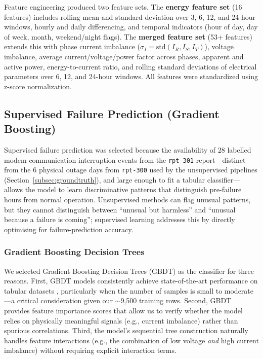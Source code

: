 \documentclass{article}
\begin{document}
Feature engineering produced two feature sets. The \textbf{energy feature set} (16 features) includes rolling mean and standard deviation over 3, 6, 12, and 24-hour windows, hourly and daily differencing, and temporal indicators (hour of day, day of week, month, weekend/night flags). The \textbf{merged feature set} (53+ features) extends this with phase current imbalance ($\sigma_I = \text{std}(I_R, I_S, I_T)$), voltage imbalance, average current/voltage/power factor across phases, apparent and active power, energy-to-current ratio, and rolling standard deviations of electrical parameters over 6, 12, and 24-hour windows. All features were standardized using z-score normalization.

\subsection{Supervised Failure Prediction (Gradient Boosting)}

Supervised failure prediction was selected because the availability of $28$ labelled modem communication interruption events from the \texttt{rpt-301} report---distinct from the $6$ physical outage days from \texttt{rpt-300} used by the unsupervised pipelines (Section~\ref{subsec:groundtruth}), and large enough to fit a tabular classifier---allows the model to learn discriminative patterns that distinguish pre-failure hours from normal operation. Unsupervised methods can flag unusual patterns, but they cannot distinguish between ``unusual but harmless'' and ``unusual because a failure is coming''; supervised learning addresses this by directly optimising for failure-prediction accuracy.

\subsubsection{Gradient Boosting Decision Trees}

We selected Gradient Boosting Decision Trees (GBDT) as the classifier for three reasons. First, GBDT models consistently achieve state-of-the-art performance on tabular datasets \cite{shwartz2022tabular}, particularly when the number of samples is small to moderate---a critical consideration given our $\sim$9,500 training rows. Second, GBDT provides feature importance scores that allow us to verify whether the model relies on physically meaningful signals (e.g., current imbalance) rather than spurious correlations. Third, the model's sequential tree construction naturally handles feature interactions (e.g., the combination of low voltage \textit{and} high current imbalance) without requiring explicit interaction terms.
\end{document}
